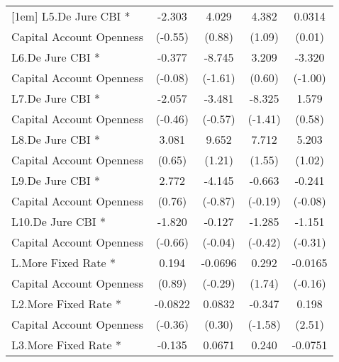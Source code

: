 {\begin{tabular}{l*{4}{c}}
[1em]
L5.De Jure CBI *    &      -2.303         &       4.029         &       4.382         &      0.0314         \\
Capital Account Openness&     (-0.55)         &      (0.88)         &      (1.09)         &      (0.01)         \\
[1em]
L6.De Jure CBI *    &      -0.377         &      -8.745         &       3.209         &      -3.320         \\
Capital Account Openness&     (-0.08)         &     (-1.61)         &      (0.60)         &     (-1.00)         \\
[1em]
L7.De Jure CBI *    &      -2.057         &      -3.481         &      -8.325         &       1.579         \\
Capital Account Openness&     (-0.46)         &     (-0.57)         &     (-1.41)         &      (0.58)         \\
[1em]
L8.De Jure CBI *    &       3.081         &       9.652         &       7.712         &       5.203         \\
Capital Account Openness&      (0.65)         &      (1.21)         &      (1.55)         &      (1.02)         \\
[1em]
L9.De Jure CBI *    &       2.772         &      -4.145         &      -0.663         &      -0.241         \\
Capital Account Openness&      (0.76)         &     (-0.87)         &     (-0.19)         &     (-0.08)         \\
[1em]
L10.De Jure CBI *   &      -1.820         &      -0.127         &      -1.285         &      -1.151         \\
Capital Account Openness&     (-0.66)         &     (-0.04)         &     (-0.42)         &     (-0.31)         \\
[1em]
L.More Fixed Rate * &       0.194         &     -0.0696         &       0.292         &     -0.0165         \\
Capital Account Openness&      (0.89)         &     (-0.29)         &      (1.74)         &     (-0.16)         \\
[1em]
L2.More Fixed Rate *&     -0.0822         &      0.0832         &      -0.347         &       0.198\sym{*}  \\
Capital Account Openness&     (-0.36)         &      (0.30)         &     (-1.58)         &      (2.51)         \\
[1em]
L3.More Fixed Rate *&      -0.135         &      0.0671         &       0.240         &     -0.0751         \\

\end{tabular}}
